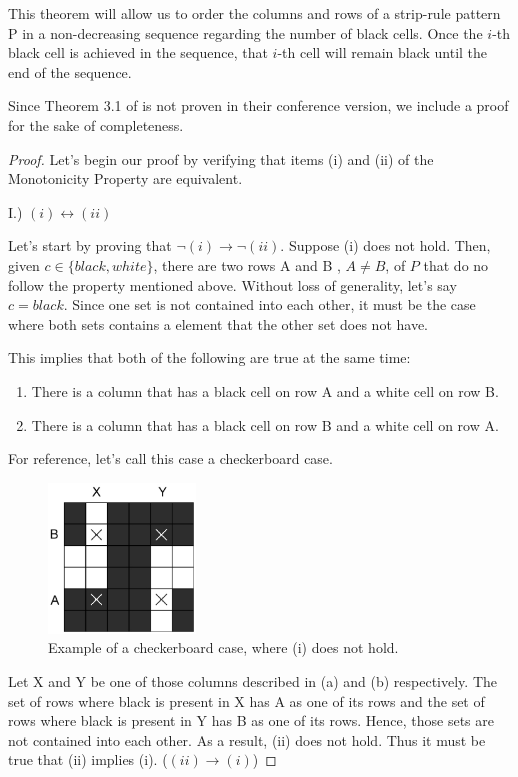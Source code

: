 This theorem will allow us to order the columns and rows of a strip-rule pattern P in a non-decreasing sequence regarding the number of black cells. Once the $i$-th black cell is achieved in the sequence, that $i$-th cell will remain black until the end of the sequence.


Since Theorem 3.1 of \cite{ACJKLW07} is not proven in their conference version,
we include a proof for the sake of completeness.
\begin{proof}

Let's begin our proof by verifying that items (i) and (ii) of the Monotonicity Property are equivalent.


I.) $(i) \leftrightarrow (ii)$

Let's start by proving that $\neg (i) \rightarrow \neg (ii)$. Suppose (i) does not hold. Then, given $c \in \{black, white\}$, there are two rows A and B , $A \neq B$, of $P$ that do no follow the property mentioned above. Without loss of generality, let's say $c = black$. Since one set is not contained into each other, it must be the case where both sets contains a element that the other set does not have.

This implies that both of the following are true at the same time:

\begin{enumerate}%
\item There is a column that has a black cell on row A and a white cell on row B.
\item There is a column that has a black cell on row B and a white cell on row A.
\end{enumerate}

For reference, let's call this case a checkerboard case.

\begin{figure}[h]
\centering
\includegraphics[height=4cm]{checkerboard_example}
\caption{Example of a checkerboard case, where (i) does not hold.}
\end{figure}

Let X and Y be one of those columns described in (a) and (b) respectively. The set of rows where black is present in X has A as one of its rows and the set of rows where black is present in Y has B as one of its rows. Hence, those sets are not contained into each other. As a result, (ii) does not hold. Thus it must be true that (ii) implies (i). ($(ii) \rightarrow (i)$)


\end{proof}
